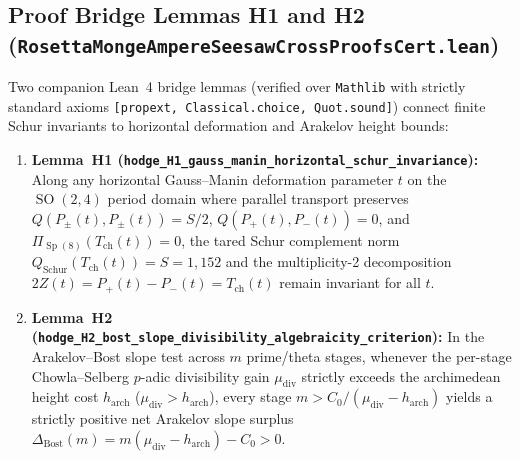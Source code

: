\documentclass[11pt,a4paper]{article}
\begin{document}
\subsection{Proof Bridge Lemmas H1 and H2 (\texttt{RosettaMongeAmpere\allowbreak{}SeesawCrossProofsCert.lean})}
Two companion Lean~4 bridge lemmas (verified over \texttt{Mathlib} with strictly standard axioms \texttt{[propext, Classical.choice, Quot.sound]}) connect finite Schur invariants to horizontal deformation and Arakelov height bounds:
\begin{enumerate}
  \item \textbf{Lemma~H1 (\texttt{hodge\_\allowbreak{}H1\_\allowbreak{}gauss\_\allowbreak{}manin\_\allowbreak{}horizontal\_\allowbreak{}schur\_\allowbreak{}invariance}):} Along any horizontal Gauss--Manin deformation parameter $t$ on the $\operatorname{SO}(2,4)$ period domain where parallel transport preserves $Q(P_\pm(t), P_\pm(t)) = S/2$, $Q(P_+(t), P_-(t)) = 0$, and $\Pi_{\operatorname{Sp}(8)}(T_{\mathrm{ch}}(t)) = 0$, the tared Schur complement norm $Q_{\mathrm{Schur}}(T_{\mathrm{ch}}(t)) = S = 1{,}152$ and the multiplicity-2 decomposition $2 Z(t) = P_+(t) - P_-(t) = T_{\mathrm{ch}}(t)$ remain invariant for all $t$.
  \item \textbf{Lemma~H2 (\texttt{hodge\_\allowbreak{}H2\_\allowbreak{}bost\_\allowbreak{}slope\_\allowbreak{}divisibility\_\allowbreak{}algebraicity\_\allowbreak{}criterion}):} In the Arakelov--Bost slope test across $m$ prime/theta stages, whenever the per-stage Chowla--Selberg $p$-adic divisibility gain $\mu_{\mathrm{div}}$ strictly exceeds the archimedean height cost $h_{\mathrm{arch}}$ ($\mu_{\mathrm{div}} > h_{\mathrm{arch}}$), every stage $m > C_0 / (\mu_{\mathrm{div}} - h_{\mathrm{arch}})$ yields a strictly positive net Arakelov slope surplus $\Delta_{\mathrm{Bost}}(m) = m(\mu_{\mathrm{div}} - h_{\mathrm{arch}}) - C_0 > 0$.
\end{enumerate}
\end{document}
